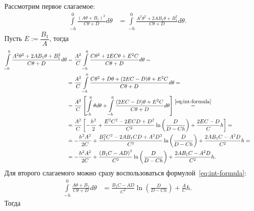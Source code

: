 \documentclass[a4paper,14pt]{article}
\begin{document}
Рассмотрим первое слагаемое:
\begin{equation*}
  \begin{aligned}
    \int\limits_{-h}^{0} \frac{{(A \theta + B_1)}^2}{C \theta + D} d\theta
    &=
    \int\limits_{-h}^{0} \frac{A^2 \theta^2 + 2 A B_1 \theta + B_1^2}{C \theta + D} d\theta.
  \end{aligned}
\end{equation*}
Пусть $E := \dfrac{B_1}{A}$, тогда
\begin{equation*}
  \begin{aligned}
    \int\limits_{-h}^{0} \frac{A^2 \theta^2 + 2 A B_1 \theta + B_1^2}{C \theta + D} d\theta
    &=
      \frac{A^2}{C}
      \int\limits_{-h}^{0} \frac{C \theta^2 + 2 E C \theta + E^2 C}{C \theta + D} d\theta = \\
    &=
      \frac{A^2}{C}
      \int\limits_{-h}^{0} \frac{
      C \theta^2 + D \theta + (2 E C - D) \theta + E^2 C
      }{C \theta + D} d\theta = \\
    &=
      \frac{A^2}{C}
      \left[
      \int\limits_{-h}^{0} \theta d\theta
      +
      \int\limits_{-h}^{0} \frac{
      (2 E C - D) \theta + E^2 C
      }{C \theta + D} d\theta
      \right] \overset{\eqref{eq:int-formula}}{=} \\
    &=
      \frac{A^2}{C}
      \left[
      -
      \frac{h^2}{2}
      +
      \frac{E^2 C^2 - 2 E C D + D^2}{C^2}
      \ln \left( \frac{D}{D - C h} \right)
      +
      \frac{2 E C - D}{C} h
      \right] = \\
    &=
      -
      \frac{h^2 A^2}{2 C}
      +
      \frac{B_1^2 C^2 - 2 A B_1 C D + A^2 D^2}{C^3}
      \ln \left( \frac{D}{D - C h} \right)
      +
      \frac{2 A B_1 C - A^2 D}{C^2} h = \\
    &=
      -
      \frac{h^2 A^2}{2 C}
      +
      \frac{{(B_1 C - A D)}^2}{C^3}
      \ln \left( \frac{D}{D - C h} \right)
      +
      \frac{2 A B_1 C - A^2 D}{C^2} h.
  \end{aligned}
\end{equation*}
Для второго слагаемого можно сразу воспользоваться формулой~\eqref{eq:int-formula}:
\begin{equation*}
  \begin{aligned}
    \int\limits_{-h}^{0}
    \frac{A \theta + B_1}{C \theta + D} d\theta
    &=
      \frac{B_1 C - A D}{C^2}
      \ln \left( \frac{D}{D - C h} \right)
      +
      \frac{A}{C} h.
  \end{aligned}
\end{equation*}
Тогда
\end{document}

